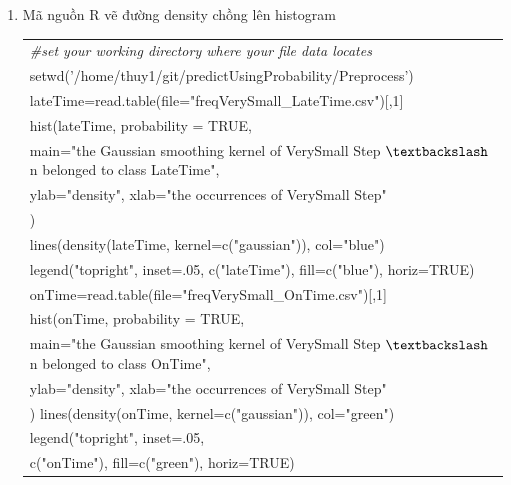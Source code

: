 \documentclass[a4paper, 13pt]{report}
\begin{document}
\begin{enumerate}[label=\textbf{PL\arabic*}]
\item \label{density} Mã nguồn R vẽ đường density chồng lên histogram
\begin{flushleft}
\begin{tabular}{  |l| }
\hline 
\textit{\#set your working directory where your file data locates}\\
setwd('/home/thuy1/git/predictUsingProbability/Preprocess')\\
lateTime=read.table(file="freqVerySmall\_LateTime.csv")[,1]\\
hist(lateTime, probability = TRUE,\\
     main="the Gaussian smoothing kernel of VerySmall Step $\textbackslash$n belonged to class LateTime",\\
     ylab="density", xlab="the occurrences of VerySmall Step"\\
     )\\
lines(density(lateTime, kernel=c("gaussian")), col="blue")\\
legend("topright", inset=.05, c("lateTime"), fill=c("blue"), horiz=TRUE)\\
onTime=read.table(file="freqVerySmall\_OnTime.csv")[,1]\\
hist(onTime, probability = TRUE,\\
     main="the Gaussian smoothing kernel of VerySmall Step $\textbackslash$n belonged to class OnTime",\\
     ylab="density", xlab="the occurrences of VerySmall Step"\\
     )
lines(density(onTime, kernel=c("gaussian")), col="green")\\
legend("topright", inset=.05, \\
       c("onTime"), fill=c("green"), horiz=TRUE)\\
\hline
\end{tabular}
\end{flushleft}


\end{enumerate}
\end{document}
